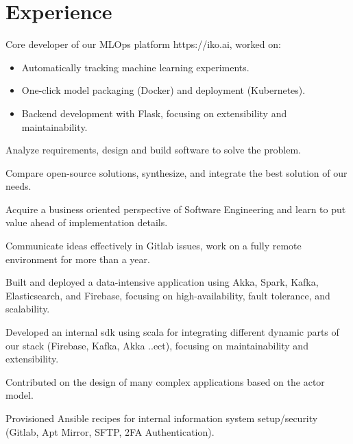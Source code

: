 \documentclass[]{plushcv}
\begin{document}
\begin{minipage}[t]{0.70\textwidth}



\section{Experience}

\vspace{\topsep} %
\begin{tightemize}
\sectionsep
\item Core developer of our MLOps platform https://iko.ai, worked on:
\begin{itemize}
    \item Automatically tracking machine learning experiments.
    \item One-click model packaging (Docker) and deployment (Kubernetes).
    \item Backend development with Flask, focusing on extensibility and maintainability.
\end{itemize}
\item Analyze requirements, design and build software to solve the problem.
\item Compare open-source solutions, synthesize, and integrate the best solution of our needs.
\item Acquire a business oriented perspective of Software Engineering and learn to put value ahead of implementation details.
\item Communicate ideas effectively in Gitlab issues, work on a fully remote environment for more than a year.
\end{tightemize}
\sectionsep
\sectionsep

\begin{tightemize}
\sectionsep
\item Built and deployed a data-intensive application using Akka, Spark, Kafka, Elasticsearch, and Firebase, focusing on high-availability, fault
tolerance, and scalability.
\item Developed an internal sdk using scala for integrating different dynamic parts of our stack (Firebase, Kafka, Akka ..ect), focusing on  maintainability
and extensibility.
\item Contributed on the design of many complex applications based on the actor model.
\item Provisioned Ansible recipes for internal information system setup/security (Gitlab, Apt Mirror, SFTP, 2FA Authentication).
\end{tightemize}
\sectionsep
\sectionsep


\end{minipage}
\end{document}
